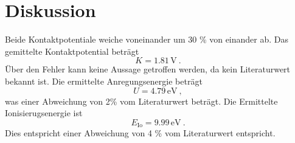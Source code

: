 \section{Diskussion}
\label{sec:Diskussion}
Beide Kontaktpotentiale weiche voneinander um 30 \% von einander ab. Das gemittelte Kontaktpotential beträgt 
\begin{equation}
  K = 1.81 \, \text{V} \ . 
\end{equation}
Über den Fehler kann keine Aussage getroffen werden, da kein Literaturwert bekannt ist. Die ermittelte Anregungsenergie beträgt 
\begin{equation}
  U = 4.79 \, \text{eV} \ ,
\end{equation}
was einer Abweichung von 2\% vom Literaturwert \cite{Ea} beträgt. Die Ermittelte Ionisierugsenergie ist
\begin{equation}
  E_\text{Io} = 9.99 \, \text{eV} \ .
\end{equation}
Dies entspricht einer Abweichung von 4 \% vom Literaturwert \cite{EIo} entspricht.
